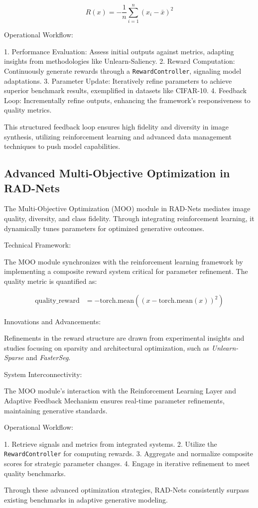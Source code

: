 \[
R(x) = -\frac{1}{n}\sum_{i=1}^{n}(x_i - \bar{x})^2
\]

Operational Workflow:

1. Performance Evaluation: Assess initial outputs against metrics, adapting insights from methodologies like Unlearn-Saliency.
2. Reward Computation: Continuously generate rewards through a \texttt{RewardController}, signaling model adaptations.
3. Parameter Update: Iteratively refine parameters to achieve superior benchmark results, exemplified in datasets like CIFAR-10.
4. Feedback Loop: Incrementally refine outputs, enhancing the framework's responsiveness to quality metrics.

This structured feedback loop ensures high fidelity and diversity in image synthesis, utilizing reinforcement learning and advanced data management techniques to push model capabilities.

\subsection{Advanced Multi-Objective Optimization in RAD-Nets}
The Multi-Objective Optimization (MOO) module in RAD-Nets mediates image quality, diversity, and class fidelity. Through integrating reinforcement learning, it dynamically tunes parameters for optimized generative outcomes.

Technical Framework:

The MOO module synchronizes with the reinforcement learning framework by implementing a composite reward system critical for parameter refinement. The quality metric is quantified as:

\begin{align}
\text{quality\_reward} &= -\text{torch.mean}\left((x - \text{torch.mean}(x))^2\right)
\end{align}

Innovations and Advancements:

Refinements in the reward structure are drawn from experimental insights and studies focusing on sparsity and architectural optimization, such as \textit{Unlearn-Sparse} and \textit{FasterSeg}.

System Interconnectivity:

The MOO module's interaction with the Reinforcement Learning Layer and Adaptive Feedback Mechanism ensures real-time parameter refinements, maintaining generative standards.

Operational Workflow:

1. Retrieve signals and metrics from integrated systems.
2. Utilize the \texttt{RewardController} for computing rewards.
3. Aggregate and normalize composite scores for strategic parameter changes.
4. Engage in iterative refinement to meet quality benchmarks.

Through these advanced optimization strategies, RAD-Nets consistently surpass existing benchmarks in adaptive generative modeling.
